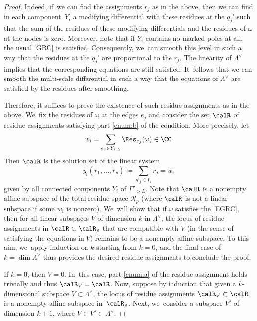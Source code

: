 \begin{proof}
Indeed, if~we can find the assignments $r_{j}$ as in the above, then we can find in each component~$Y_{i}$ a modifying differential with these residues at the $q_{j}'$ such that the sum of the residues of these modifying differentials and the residues of $\omega$ at the nodes is zero. Moreover, note that if $Y_i$ contains no marked poles at all, the usual \ref{GRC} is satisfied. Consequently, we~can smooth this level in such a way that the residues at the $q_{j}'$ are proportional to the $r_{j}$. The linearity of $\Lambda^{\vee}$ implies that the corresponding equations are still satisfied. It~follows that we can smooth the multi-scale differential in such a way that the equations of $\Lambda^{\vee}$ are satisfied by the residues after smoothing.

Therefore, it suffices to prove the existence of such residue assignments as in the above. We~fix the residues of $\omega$ at the edges $e_{j}$ and consider the set $\calR$ of residue assignments satisfying part \eqref{enum:b} of the condition. More precisely, let
\[
w_{i}=\sum_{e_j \in Y_{i, L}}\Res_{e_j} (\omega) \in \CC.
\]
Then $\calR$ is the solution set of the linear system
\[
y_{i}(r_1,\ldots, r_p)\coloneqq\sum_{q'_j\in Y_i}r_{j}=w_{i}\,
\]
given by all connected components $Y_i$ of $\Gamma'_{>L}$.
Note that $\calR$ is a nonempty affine subspace of the total residue space $\mathcal{R}_{p}$ (where $\calR$ is not a linear subspace if some $w_i$ is nonzero). We~will show that if $\omega$ satisfies the \ref{EGRC}, then for all linear subspaces $V$ of dimension $k$ in $\Lambda^{\vee}$, the locus of residue assignments in $\calR\subset \calR_p$ that are compatible with $V$ (in the sense of satisfying the equations in $V$) remains to be a nonempty affine subspace.
To this aim, we~apply induction on $k$ starting from $k=0$, and the final case of $k=\dim \Lambda^{\vee}$ thus provides the desired residue assignments to conclude the proof.

If $k=0$, then $V=0$. In~this case, part \eqref{enum:a} of the residue assignment holds trivially and thus $\calR_{V}=\calR$.
Now, suppose by induction that given a $k$-dimensional subspace $V\subset \Lambda^{\vee}$,
the locus of residue assignments $\calR_{V}\subset \calR$ is a nonempty affine subspace in~$\calR_p$.
Next, we~consider a subspace $V'$ of dimension $k+1$, where $V\subset V'\subset \Lambda^{\vee}$.


\end{proof}
